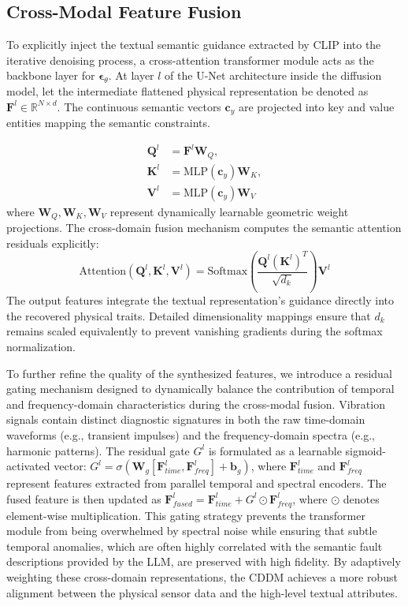 \subsection{Cross-Modal Feature Fusion}
\label{subsec:cross_modal_fusion}

To explicitly inject the textual semantic guidance extracted by CLIP into the iterative denoising process, a cross-attention transformer module acts as the backbone layer for $\boldsymbol{\epsilon}_\theta$. At layer $l$ of the U-Net architecture inside the diffusion model, let the intermediate flattened physical representation be denoted as $\mathbf{F}^l \in \mathbb{R}^{N \times d}$. The continuous semantic vectors $\mathbf{c}_y$ are projected into key and value entities mapping the semantic constraints.

\begin{align}
\mathbf{Q}^l &= \mathbf{F}^l \mathbf{W}_Q, \label{eq:query} \\
\mathbf{K}^l &= \text{MLP}(\mathbf{c}_y) \mathbf{W}_K, \label{eq:key} \\
\mathbf{V}^l &= \text{MLP}(\mathbf{c}_y) \mathbf{W}_V \label{eq:value}
\end{align}
where $\mathbf{W}_Q, \mathbf{W}_K, \mathbf{W}_V$ represent dynamically learnable geometric weight projections. The cross-domain fusion mechanism computes the semantic attention residuals explicitly:
\begin{equation}\label{eq:cross_attention}
\text{Attention}(\mathbf{Q}^l, \mathbf{K}^l, \mathbf{V}^l) = \text{Softmax}\left( \frac{\mathbf{Q}^l (\mathbf{K}^l)^T}{\sqrt{d_k}} \right) \mathbf{V}^l
\end{equation}
The output features integrate the textual representation's guidance directly into the recovered physical traits. Detailed dimensionality mappings ensure that $d_k$ remains scaled equivalently to prevent vanishing gradients during the softmax normalization.

To further refine the quality of the synthesized features, we introduce a residual gating mechanism designed to dynamically balance the contribution of temporal and frequency-domain characteristics during the cross-modal fusion. Vibration signals contain distinct diagnostic signatures in both the raw time-domain waveforms (e.g., transient impulses) and the frequency-domain spectra (e.g., harmonic patterns). The residual gate $G^l$ is formulated as a learnable sigmoid-activated vector: $G^l = \sigma(\mathbf{W}_g [\mathbf{F}_{time}^l, \mathbf{F}_{freq}^l] + \mathbf{b}_g)$, where $\mathbf{F}_{time}^l$ and $\mathbf{F}_{freq}^l$ represent features extracted from parallel temporal and spectral encoders. The fused feature is then updated as $\mathbf{F}_{fused}^l = \mathbf{F}_{time}^l + G^l \odot \mathbf{F}_{freq}^l$, where $\odot$ denotes element-wise multiplication. This gating strategy prevents the transformer module from being overwhelmed by spectral noise while ensuring that subtle temporal anomalies, which are often highly correlated with the semantic fault descriptions provided by the LLM, are preserved with high fidelity. By adaptively weighting these cross-domain representations, the CDDM achieves a more robust alignment between the physical sensor data and the high-level textual attributes.


